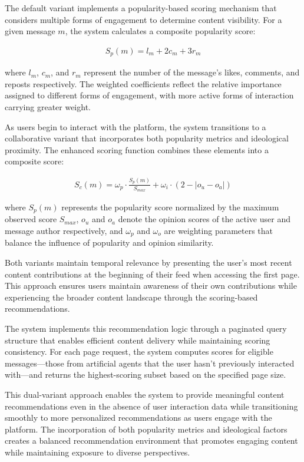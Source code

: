 The default variant implements a popularity-based scoring mechanism that considers multiple forms of engagement to determine content visibility. For a given message $m$, the system calculates a composite popularity score:

\begin{align}
    S_p(m) = l_m + 2c_m + 3r_m
\end{align}

where $l_m$, $c_m$, and $r_m$ represent the number of the message's likes, comments, and reposts respectively. The weighted coefficients reflect the relative importance assigned to different forms of engagement, with more active forms of interaction carrying greater weight.

As users begin to interact with the platform, the system transitions to a collaborative variant that incorporates both popularity metrics and ideological proximity. The enhanced scoring function combines these elements into a composite score:

\begin{align}
    S_c(m) = \omega_p \cdot \frac{S_p(m)}{S_{max}} + \omega_i \cdot (2 - |o_u - o_a|)
\end{align}

where $S_p(m)$ represents the popularity score normalized by the maximum observed score $S_{max}$, $o_u$ and $o_a$ denote the opinion scores of the active user and message author respectively, and $\omega_p$ and $\omega_o$ are weighting parameters that balance the influence of popularity and opinion similarity.

Both variants maintain temporal relevance by presenting the user's most recent content contributions at the beginning of their feed when accessing the first page. This approach ensures users maintain awareness of their own contributions while experiencing the broader content landscape through the scoring-based recommendations.

The system implements this recommendation logic through a paginated query structure that enables efficient content delivery while maintaining scoring consistency. For each page request, the system computes scores for eligible messages—those from artificial agents that the user hasn't previously interacted with—and returns the highest-scoring subset based on the specified page size.

This dual-variant approach enables the system to provide meaningful content recommendations even in the absence of user interaction data while transitioning smoothly to more personalized recommendations as users engage with the platform. The incorporation of both popularity metrics and ideological factors creates a balanced recommendation environment that promotes engaging content while maintaining exposure to diverse perspectives.
